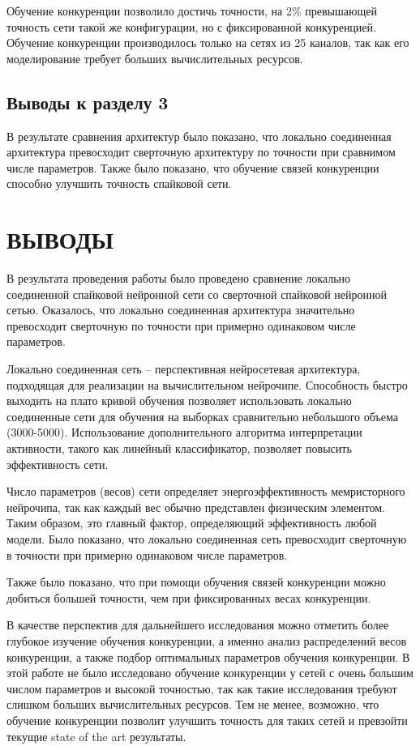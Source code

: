 \documentclass[a4paper]{article}
\begin{document}
Обучение конкуренции позволило достичь точности, на 2\% превышающей точность сети такой же конфигурации, но с фиксированной конкуренцией. Обучение конкуренции производилось только на сетях из 25 каналов, так как его моделирование требует больших вычислительных ресурсов.

\subsection*{Выводы к разделу 3}
В результате сравнения архитектур было показано, что локально соединенная архитектура превосходит
сверточную архитектуру по точности при сравнимом числе параметров. Также было показано, что обучение связей конкуренции способно улучшить точность спайковой сети.

\clearpage

\section*{ВЫВОДЫ}
В результата проведения работы было проведено сравнение локально соединенной спайковой нейронной сети со сверточной спайковой нейронной сетью. Оказалось, что локально соединенная архитектура значительно превосходит сверточную по точности при примерно одинаковом числе параметров.

Локально соединенная сеть – перспективная нейросетевая архитектура, подходящая для реализации на вычислительном нейрочипе. Способность быстро выходить на плато кривой обучения позволяет использовать локально соединенные сети для обучения на выборках сравнительно небольшого объема (3000-5000). Использование дополнительного алгоритма интерпретации активности, такого как линейный классификатор, позволяет повысить эффективность сети.

Число параметров (весов) сети определяет энергоэффективность мемристорного нейрочипа, так как каждый вес обычно представлен физическим элементом. Таким образом, это главный фактор, определяющий эффективность любой модели. Было показано, что локально соединенная сеть превосходит сверточную в точности при примерно одинаковом числе параметров.

Также было показано, что при помощи обучения связей конкуренции можно добиться большей точности, чем при фиксированных весах конкуренции.

В качестве перспектив для дальнейшего исследования можно отметить более глубокое изучение обучения конкуренции, а именно анализ распределений весов конкуренции, а также подбор оптимальных параметров обучения конкуренции. В этой работе не было исследовано обучение конкуренции у сетей с очень большим числом параметров и высокой точностью, так как такие исследования требуют слишком больших вычислительных ресурсов. Тем не менее, возможно, что обучение конкуренции позволит улучшить точность для таких сетей и превзойти текущие state of the art результаты.
\end{document}
